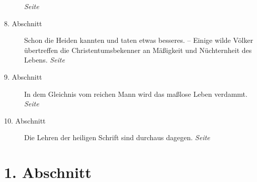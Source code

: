 \begin{description}
\dotfill \textit{Seite~\pageref{kap14_ab7}}\\
\item[8. Abschnitt] Schon die Heiden kannten und taten etwas besseres. --
Einige wilde Völker übertreffen die Christentumsbekenner an Mäßigkeit und
Nüchternheit des Lebens.
\dotfill \textit{Seite~\pageref{kap14_ab8}}\\
\item[9. Abschnitt] In dem Gleichnis vom reichen Mann wird das
maßlose Leben
verdammt.
\dotfill \textit{Seite~\pageref{kap14_ab9}}\\
\item[10. Abschnitt] Die Lehren der heiligen Schrift sind durchaus dagegen.
\dotfill \textit{Seite~\pageref{kap14_ab10}}\\
\end{description}

\newpage

\section{1. Abschnitt} \label{kap14_ab1}

